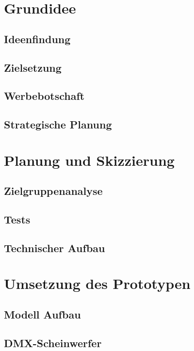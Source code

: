 







\tableofcontents
\clearpage



\section{Grundidee}
\subsection{Ideenfindung}
\subsection{Zielsetzung}
\subsection{Werbebotschaft}
\subsection{Strategische Planung}

\section{Planung und Skizzierung}
\subsection{Zielgruppenanalyse}
\subsection{Tests}
\subsection{Technischer Aufbau}

\section{Umsetzung des Prototypen}
\subsection{Modell Aufbau}
\newpage
\subsection{DMX-Scheinwerfer}


